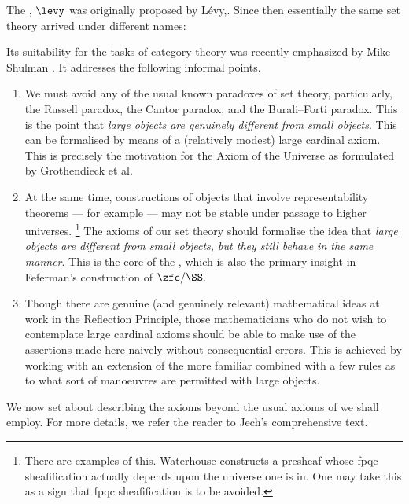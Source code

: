 The , $\levy$ was originally proposed by Lévy,\citep{Levy1960}.
Since then essentially the same set theory arrived under different names:

Its suitability for the tasks of category theory was recently emphasized by Mike Shulman \citep{Shulman:2008th}.
It addresses the following informal points.
\begin{enumerate}
	\item We must avoid any of the usual known paradoxes of set theory,
		particularly, the Russell paradox, the Cantor paradox, and the Burali–Forti paradox.
		This is the point that \emph{large objects are genuinely different from small objects}.
		This can be formalised by means of a (relatively modest) large cardinal axiom.
		This is precisely the motivation for the Axiom of the Universe
		as formulated by Grothendieck et al.\citep[Exposé I, \S 0 and Appendix]{SGA41}
	\item At the same time, constructions of objects that involve representability theorems --- for example --- may not be stable under passage to higher universes.%
		\footnote{There are examples of this.
			Waterhouse constructs a presheaf whose fpqc sheafification actually depends upon the universe one is in.
			One may take this as a sign that fpqc sheafification is to be avoided.}
		The axioms of our set theory should formalise the idea that \emph{large objects are different from small objects, but they still behave in the same manner}.
		This is the core of the , which is also the primary insight in Feferman's construction of $\zfc/\SS$.
	\item Though there are genuine (and genuinely relevant) mathematical ideas at work in the Reflection Principle,
		those mathematicians who do not wish to contemplate large cardinal axioms should be able to make use of the assertions made here naively without consequential errors.
		This is achieved by working with an extension of the more familiar \zfc combined with a few rules as to what sort of manoeuvres are permitted with large objects.
\end{enumerate}

We now set about describing the axioms beyond the usual axioms of \zfc we shall employ.
For more details, we refer the reader to Jech's comprehensive text.\citep{Jech2003}

